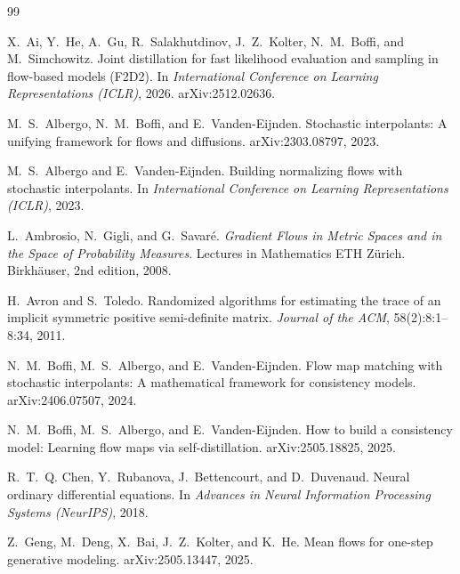 \documentclass[11pt,a4paper]{article}
\numberwithin{equation}{section}     %
\theoremstyle{plain}        %
\theoremstyle{definition}   %
\theoremstyle{remark}       %
\begin{document}
\begin{thebibliography}{99}

X.~Ai, Y.~He, A.~Gu, R.~Salakhutdinov, J.~Z.~Kolter, N.~M.~Boffi, and M.~Simchowitz.
\newblock Joint distillation for fast likelihood evaluation and sampling in flow-based models (F2D2).
\newblock In \emph{International Conference on Learning Representations (ICLR)}, 2026. arXiv:2512.02636.

M.~S.~Albergo, N.~M.~Boffi, and E.~Vanden-Eijnden.
\newblock Stochastic interpolants: A unifying framework for flows and diffusions.
\newblock arXiv:2303.08797, 2023.

M.~S.~Albergo and E.~Vanden-Eijnden.
\newblock Building normalizing flows with stochastic interpolants.
\newblock In \emph{International Conference on Learning Representations (ICLR)}, 2023.

L.~Ambrosio, N.~Gigli, and G.~Savar\'e.
\newblock \emph{Gradient Flows in Metric Spaces and in the Space of Probability Measures}.
\newblock Lectures in Mathematics ETH Z\"urich. Birkh\"auser, 2nd edition, 2008.

H.~Avron and S.~Toledo.
\newblock Randomized algorithms for estimating the trace of an implicit symmetric positive semi-definite matrix.
\newblock \emph{Journal of the ACM}, 58(2):8:1--8:34, 2011.

N.~M.~Boffi, M.~S.~Albergo, and E.~Vanden-Eijnden.
\newblock Flow map matching with stochastic interpolants: A mathematical framework for consistency models.
\newblock arXiv:2406.07507, 2024.

N.~M.~Boffi, M.~S.~Albergo, and E.~Vanden-Eijnden.
\newblock How to build a consistency model: Learning flow maps via self-distillation.
\newblock arXiv:2505.18825, 2025.

R.~T.~Q. Chen, Y.~Rubanova, J.~Bettencourt, and D.~Duvenaud.
\newblock Neural ordinary differential equations.
\newblock In \emph{Advances in Neural Information Processing Systems (NeurIPS)}, 2018.

Z.~Geng, M.~Deng, X.~Bai, J.~Z.~Kolter, and K.~He.
\newblock Mean flows for one-step generative modeling.
\newblock arXiv:2505.13447, 2025.


\end{thebibliography}
\end{document}
